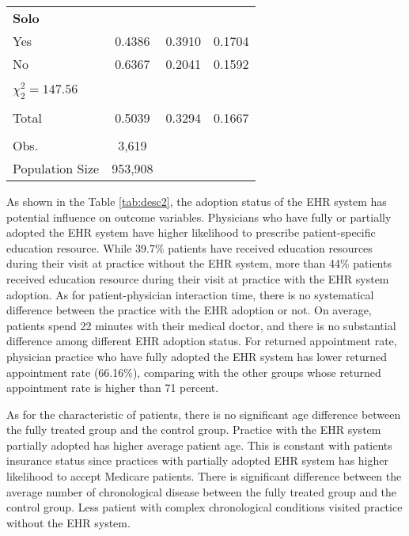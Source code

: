 \documentclass[12pt]{report}
\begin{document}
{\begin{center}
\begin{longtable}{lccc}
\textbf{Solo}                          &          &            &            \\
Yes                                    & 0.4386   & 0.3910     & 0.1704     \\
No                                     & 0.6367   & 0.2041     & 0.1592     \\
                                       &          &            &            \\
$\chi^2_2 = 147.56$                    &          &            &            \\
                                       &          &            &            \\
Total                                  & 0.5039   & 0.3294     & 0.1667     \\
                                       &          &            &            \\
Obs.                                   & 3,619    &            &            \\
Population Size                        & 953,908  &            &            \\ 
\end{longtable}
\end{center}}

As shown in the Table \ref{tab:desc2}, the adoption status of the EHR system has potential influence on outcome variables. Physicians who have fully or partially adopted the EHR system have higher likelihood to prescribe patient-specific education resource. While 39.7\% patients have received education resources during their visit at practice without the EHR system, more than 44\% patients received education resource during their visit at practice with the EHR system adoption. As for patient-physician interaction time, there is no systematical difference between the practice with the EHR adoption or not. On average, patients spend 22 minutes with their medical doctor, and there is no substantial difference among different EHR adoption status. For returned appointment rate, physician practice who have fully adopted the EHR system has lower returned appointment rate (66.16\%), comparing with the other groups whose returned appointment rate is higher than 71 percent.

As for the characteristic of patients, there is no significant age difference between the fully treated group and the control group. Practice with the EHR system partially adopted has higher average patient age. This is constant with patients insurance status since practices with partially adopted EHR system has higher likelihood to accept Medicare patients.  There is significant difference between the average number of chronological disease between the fully treated group and the control group. Less patient with complex chronological conditions visited practice without the EHR system. 
\end{document}

